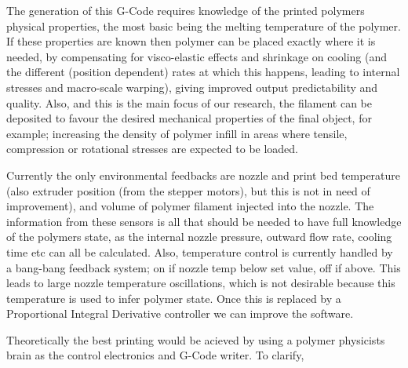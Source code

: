 \documentclass{letter}
\begin{document}
The generation of this G-Code requires knowledge of the printed polymers
physical properties, the most basic being the melting temperature of the
polymer. If these properties are known then polymer can be placed exactly
where it is needed, by compensating for visco-elastic effects and shrinkage on
cooling (and the different (position dependent) rates at which this happens,
leading to internal stresses and macro-scale warping), giving improved output
predictability and quality. Also, and this is the main focus of our research,
the filament can be deposited to favour the desired mechanical properties of
the final object, for example; increasing the density of polymer infill in
areas where tensile, compression or rotational stresses are expected to be
loaded.

Currently the only environmental feedbacks are nozzle and print bed
temperature (also extruder position (from the stepper motors), but this is not
in need of improvement), and volume of polymer filament injected into the
nozzle. The information from these sensors is all that should be needed to
have full knowledge of the polymers state, as the internal nozzle pressure,
outward flow rate, cooling time etc can all be calculated. Also, temperature
control is currently handled by a bang-bang feedback system; on if nozzle temp
below set value, off if above. This leads to large nozzle temperature
oscillations, which is not desirable because this temperature is used to infer
polymer state. Once this is replaced by a Proportional Integral Derivative
controller we can improve the software.

Theoretically the best printing would be acieved by using a polymer physicists
brain as the control electronics and G-Code writer. To clarify, \ \ \
\end{document}
